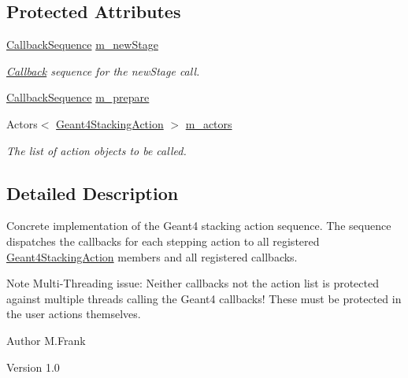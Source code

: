 \subsection*{Protected Attributes}
\begin{DoxyCompactItemize}
\item 
\hyperlink{struct_d_d4hep_1_1_callback_sequence}{CallbackSequence} \hyperlink{class_d_d4hep_1_1_simulation_1_1_geant4_stacking_action_sequence_a9a67c9ae5d00befcdfaa81dfcac6dfb1}{m\_\-newStage}
\begin{DoxyCompactList}\small\item\em \hyperlink{class_d_d4hep_1_1_callback}{Callback} sequence for the newStage call. \item\end{DoxyCompactList}\item 
\hyperlink{struct_d_d4hep_1_1_callback_sequence}{CallbackSequence} \hyperlink{class_d_d4hep_1_1_simulation_1_1_geant4_stacking_action_sequence_a5e1405fee094690bb84d74c38b619bbc}{m\_\-prepare}
\item 
Actors$<$ \hyperlink{class_d_d4hep_1_1_simulation_1_1_geant4_stacking_action}{Geant4StackingAction} $>$ \hyperlink{class_d_d4hep_1_1_simulation_1_1_geant4_stacking_action_sequence_af1288d59daee21aca2f409b9dc629a04}{m\_\-actors}
\begin{DoxyCompactList}\small\item\em The list of action objects to be called. \item\end{DoxyCompactList}\end{DoxyCompactItemize}


\subsection{Detailed Description}
Concrete implementation of the Geant4 stacking action sequence. The sequence dispatches the callbacks for each stepping action to all registered \hyperlink{class_d_d4hep_1_1_simulation_1_1_geant4_stacking_action}{Geant4StackingAction} members and all registered callbacks.

Note Multi-\/Threading issue: Neither callbacks not the action list is protected against multiple threads calling the Geant4 callbacks! These must be protected in the user actions themselves.

\begin{DoxyAuthor}{Author}
M.Frank 
\end{DoxyAuthor}
\begin{DoxyVersion}{Version}
1.0 
\end{DoxyVersion}


